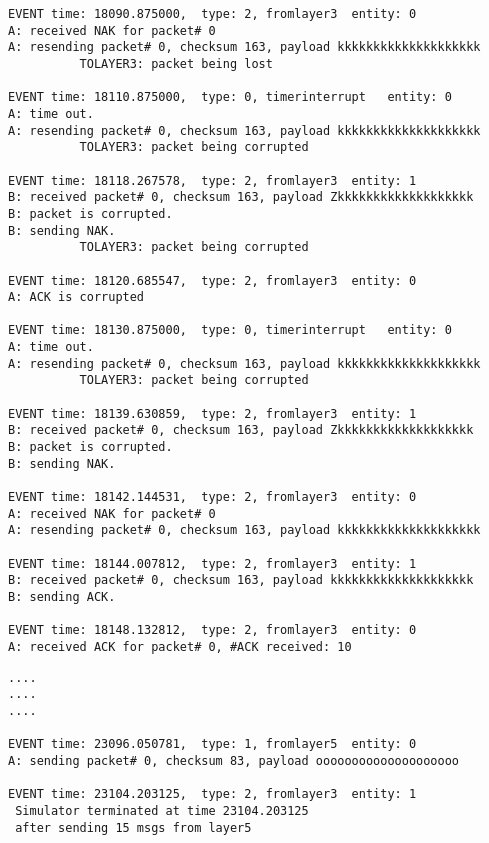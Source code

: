 \documentclass[12pt]{article}
\begin{document}
\begin{Verbatim}[frame=single, rulecolor=\color{cyan}, label=10 messages ACKed correctly]
EVENT time: 18090.875000,  type: 2, fromlayer3  entity: 0
A: received NAK for packet# 0
A: resending packet# 0, checksum 163, payload kkkkkkkkkkkkkkkkkkkk
          TOLAYER3: packet being lost

EVENT time: 18110.875000,  type: 0, timerinterrupt   entity: 0
A: time out. 
A: resending packet# 0, checksum 163, payload kkkkkkkkkkkkkkkkkkkk
          TOLAYER3: packet being corrupted

EVENT time: 18118.267578,  type: 2, fromlayer3  entity: 1
B: received packet# 0, checksum 163, payload Zkkkkkkkkkkkkkkkkkkk
B: packet is corrupted.
B: sending NAK.
          TOLAYER3: packet being corrupted

EVENT time: 18120.685547,  type: 2, fromlayer3  entity: 0
A: ACK is corrupted

EVENT time: 18130.875000,  type: 0, timerinterrupt   entity: 0
A: time out. 
A: resending packet# 0, checksum 163, payload kkkkkkkkkkkkkkkkkkkk
          TOLAYER3: packet being corrupted

EVENT time: 18139.630859,  type: 2, fromlayer3  entity: 1
B: received packet# 0, checksum 163, payload Zkkkkkkkkkkkkkkkkkkk
B: packet is corrupted.
B: sending NAK.

EVENT time: 18142.144531,  type: 2, fromlayer3  entity: 0
A: received NAK for packet# 0
A: resending packet# 0, checksum 163, payload kkkkkkkkkkkkkkkkkkkk

EVENT time: 18144.007812,  type: 2, fromlayer3  entity: 1
B: received packet# 0, checksum 163, payload kkkkkkkkkkkkkkkkkkkk
B: sending ACK.

EVENT time: 18148.132812,  type: 2, fromlayer3  entity: 0
A: received ACK for packet# 0, #ACK received: 10
\end{Verbatim}
\begin{verbatim}
....
....
....

EVENT time: 23096.050781,  type: 1, fromlayer5  entity: 0
A: sending packet# 0, checksum 83, payload oooooooooooooooooooo

EVENT time: 23104.203125,  type: 2, fromlayer3  entity: 1
 Simulator terminated at time 23104.203125
 after sending 15 msgs from layer5
\end{verbatim}
\end{document}
